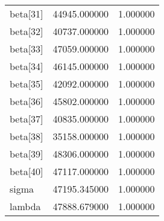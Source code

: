 \begin{tabular}{lrr}
beta[31] & 44945.000000 & 1.000000 \\
beta[32] & 40737.000000 & 1.000000 \\
beta[33] & 47059.000000 & 1.000000 \\
beta[34] & 46145.000000 & 1.000000 \\
beta[35] & 42092.000000 & 1.000000 \\
beta[36] & 45802.000000 & 1.000000 \\
beta[37] & 40835.000000 & 1.000000 \\
beta[38] & 35158.000000 & 1.000000 \\
beta[39] & 48306.000000 & 1.000000 \\
beta[40] & 47117.000000 & 1.000000 \\
sigma & 47195.345000 & 1.000000 \\
lambda & 47888.679000 & 1.000000 \\
\bottomrule
\end{tabular}
